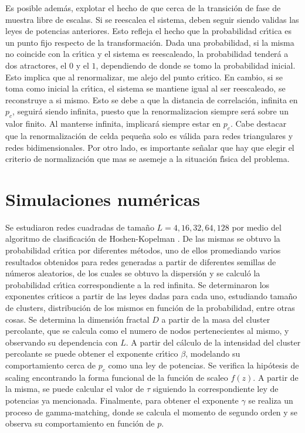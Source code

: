 \documentclass[
 reprint,
 amsmath,amssymb,
 aps,
]{revtex4-1}
\begin{document}
Es posible adem\'as, explotar el hecho de que cerca de la transici\'on de fase de muestra libre de escalas. Si se reescalea el sistema, deben seguir siendo validas las leyes de potencias anteriores. Esto refleja el hecho que la probabilidad cr\'\i tica es un punto fijo respecto de la transformaci\'on. Dada una probabilidad, si la misma no coincide con la cr\'\i tica y el sistema es reescaleado, la probabilidad tender\'a a dos atractores, el $0$ y el $1$, dependiendo de donde se tomo la probabilidad inicial. Esto implica que al renormalizar, me alejo del punto cr\'\i tico. En cambio, si se toma como inicial la cr\'\i tica, el sistema se mantiene igual al ser reescaleado, se reconstruye a si mismo. Esto se debe a que la distancia de correlaci\'on, infinita en $p_c$, seguir\'a siendo infinita, puesto que la renormalizacion siempre ser\'a sobre un valor finito. Al manterse infinita, implicar\'a siempre estar en $p_c$. Cabe destacar que la renormalizaci\'on de celda peque\~na solo es v\'alida para redes triangulares y redes bidimensionales. Por otro lado, es importante se\~nalar que hay que elegir el criterio de normalizaci\'on que mas se asemeje a la situaci\'on f\'\i sica del problema.

\section{\label{simulations}Simulaciones num\'ericas}

Se estudiaron redes cuadradas de tama\~no $L=4, 16, 32, 64, 128$ por medio del algoritmo de clasificaci\'on de Hoshen-Kopelman \cite{Kopelman}. De las mismas se obtuvo la probabilidad cr\'\i tica por diferentes m\'etodos, uno de ellos promediando varios resultados obtenidos para redes generadas a partir de diferentes semillas de n\'umeros aleatorios, de los cuales se obtuvo la dispersi\'on y se calcul\'o la probabilidad cr\'\i tica correspondiente a la red infinita.
Se determinaron los exponentes cr\'\i ticos a partir de las leyes dadas para cada uno, estudiando tama\~no de clusters, distribuci\'on de los mismos en funci\'on de la probabilidad, entre otras cosas.
Se determina la dimensi\'on fractal $D$ a partir de la masa del cluster percolante, que se calcula como el numero de nodos pertenecientes al mismo, y observando su dependencia con $L$.
A partir del c\'alculo de la intensidad del cluster percolante se puede obtener el exponente cr\'\i tico $\beta$, modelando su comportamiento cerca de $p_c$ como una ley de potencias.
Se verifica la hip\'otesis de scaling encontrando la forma funcional de la funci\'on de scaleo $f(z)$. A partir de la misma, se puede calcular el valor de $\tau$ siguiendo la correspondiente ley de potencias ya mencionada.
Finalmente, para obtener el exponente $\gamma$ se realiza un proceso de gamma-matching, donde se calcula el momento de segundo orden y se observa su comportamiento en funci\'on de $p$.
\end{document}
